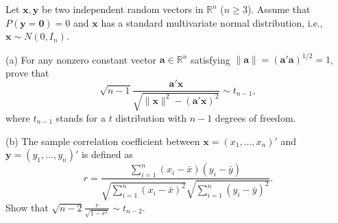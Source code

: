 \begin{exercise}\label{probability:2017:5}
Let $\mathbf{x}, \mathbf{y}$ be two independent random vectors in $\mathbb{R}^n$ ($n \geq 3$). Assume that $P(\mathbf{y} = \mathbf{0}) = 0$ and $\mathbf{x}$ has a standard multivariate normal distribution, i.e., $\mathbf{x} \sim N(0, I_n)$.

(a) For any nonzero constant vector $\mathbf{a} \in \mathbb{R}^n$ satisfying $\|\mathbf{a}\| = (\mathbf{a}'\mathbf{a})^{1/2} = 1$, prove that
\[
\sqrt{n-1}\frac{\mathbf{a}'\mathbf{x}}{\sqrt{\|\mathbf{x}\|^2 - (\mathbf{a}'\mathbf{x})^2}} \sim t_{n-1},
\]
where $t_{n-1}$ stands for a $t$ distribution with $n-1$ degrees of freedom.

(b) The sample correlation coefficient between $\mathbf{x} = (x_1, ..., x_n)'$ and $\mathbf{y} = (y_1, ..., y_n)'$ is defined as
\[
r = \frac{\sum_{i=1}^n (x_i - \bar{x})(y_i - \bar{y})}{\sqrt{\sum_{i=1}^n (x_i - \bar{x})^2}\sqrt{\sum_{i=1}^n (y_i - \bar{y})^2}}.
\]
Show that $\sqrt{n-2}\frac{r}{\sqrt{1-r^2}} \sim t_{n-2}$.

%

%
\end{exercise}

